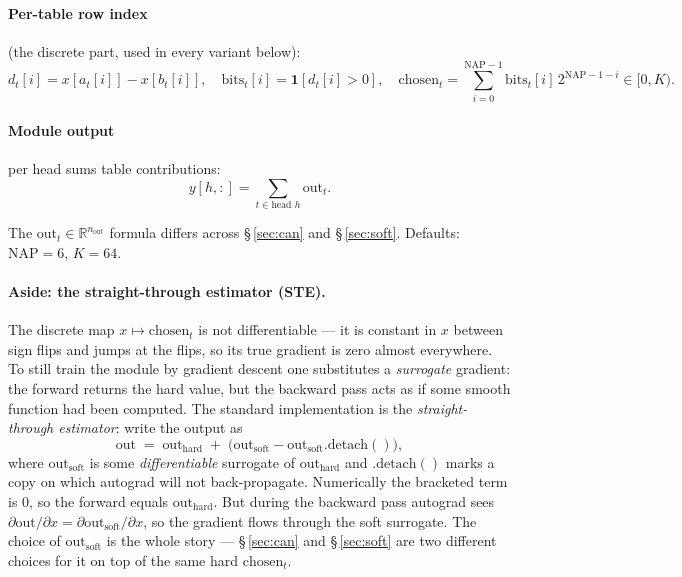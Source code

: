 \documentclass[11pt]{article}
\begin{document}
\paragraph{Per-table row index} (the discrete part, used in every variant
below):
\[
  d_t[i] = x[a_t[i]] - x[b_t[i]],\quad
  \mathrm{bits}_t[i] = \mathbf{1}[d_t[i]>0],\quad
  \mathrm{chosen}_t = \sum_{i=0}^{\mathrm{NAP}-1}\mathrm{bits}_t[i]\,2^{\mathrm{NAP}-1-i}\in[0,K).
\]

\paragraph{Module output} per head sums table contributions:
\[
  y[h,:] = \sum_{t\in\text{head }h} \text{out}_t.
\]

The $\text{out}_t\in\mathbb{R}^{n_{\mathrm{out}}}$ formula differs across
\S\,\ref{sec:can} and \S\,\ref{sec:soft}. Defaults: $\mathrm{NAP}{=}6$,
$K{=}64$.

\paragraph{Aside: the straight-through estimator (STE).}
The discrete map $x\mapsto\mathrm{chosen}_t$ is not differentiable --- it is
constant in $x$ between sign flips and jumps at the flips, so its true
gradient is zero almost everywhere. To still train the module by
gradient descent one substitutes a \emph{surrogate} gradient: the
forward returns the hard value, but the backward pass acts as if some
smooth function had been computed. The standard implementation is
the \emph{straight-through estimator}: write the output as
\[
  \text{out} \;=\; \text{out}_{\mathrm{hard}}
                 \;+\; \bigl(\text{out}_{\mathrm{soft}}
                            - \text{out}_{\mathrm{soft}}.\mathrm{detach}()\bigr),
\]
where $\text{out}_{\mathrm{soft}}$ is some \emph{differentiable} surrogate
of $\text{out}_{\mathrm{hard}}$ and $.\mathrm{detach}()$ marks a copy on
which autograd will not back-propagate. Numerically the bracketed term is
$0$, so the forward equals $\text{out}_{\mathrm{hard}}$. But during the
backward pass autograd sees $\partial \text{out}/\partial x =
\partial \text{out}_{\mathrm{soft}}/\partial x$, so the gradient flows
through the soft surrogate. The choice of $\text{out}_{\mathrm{soft}}$ is
the whole story --- \S\,\ref{sec:can} and \S\,\ref{sec:soft} are two
different choices for it on top of the same hard $\mathrm{chosen}_t$.

\end{document}

